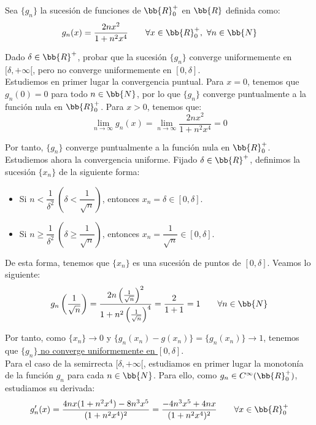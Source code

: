 \begin{ejercicio}
    Sea $\{g_n\}$ la sucesión de funciones de $\bb{R}^+_0$ en $\bb{R}$ definida como:
    \begin{equation*}
        g_n(x) = \frac{2nx^2}{1+n^2x^4} \qquad \forall x\in \bb{R}^+_0,~\forall n\in \bb{N}
    \end{equation*}

    Dado $\delta\in \bb{R}^+$, probar que la sucesión $\{g_n\}$ converge uniformemente en $[\delta,+\infty[$, pero no
    converge uniformemente en $[0,\delta]$.\\


    Estudiemos en primer lugar la convergencia puntual. Para $x=0$, tenemos que $g_n(0)=0$ para todo $n\in \bb{N}$, por lo que $\{g_n\}$ converge puntualmente a la función nula en $\bb{R}^+_0$. Para $x>0$, tenemos que:
    \begin{equation*}
        \lim_{n\to \infty} g_n(x) = \lim_{n\to \infty} \frac{2nx^2}{1+n^2x^4} = 0
    \end{equation*}

    Por tanto, $\{g_n\}$ converge puntualmente a la función nula en $\bb{R}^+_0$.\\

    Estudiemos ahora la convergencia uniforme. Fijado $\delta\in \bb{R}^+$, definimos la sucesión $\{x_n\}$ de la siguiente forma:
    \begin{itemize}
        \item Si $n < \dfrac{1}{\delta^2}~\left(\delta < \dfrac{1}{\sqrt{n}}\right)$, entonces $x_n = \delta \in [0,\delta]$.
        \item Si $n \geq \dfrac{1}{\delta^2}~\left(\delta \geq \dfrac{1}{\sqrt{n}}\right)$, entonces $x_n = \dfrac{1}{\sqrt{n}}\in [0,\delta]$.
    \end{itemize}

    De esta forma, tenemos que $\{x_n\}$ es una sucesión de puntos de $[0,\delta]$. Veamos lo siguiente:
    \begin{equation*}
        g_n\left(\frac{1}{\sqrt{n}}\right) = \frac{2n\left(\frac{1}{\sqrt{n}}\right)^2}{1+n^2\left(\frac{1}{\sqrt{n}}\right)^4} =
        \frac{2}{1+1}=1 \qquad \forall n\in \bb{N}
    \end{equation*}

    Por tanto, como $\{x_n\}\to 0$ y $\{g_n(x_n)-g(x_n)\}=\{g_n(x_n)\}\to 1$, tenemos que \ul{$\{g_n\}$ no converge uniformemente en $[0,\delta]$}.\\

    Para el caso de la semirrecta $[\delta,+\infty[$, estudiamos en primer lugar la monotonía de la función $g_n$ para cada $n\in \bb{N}$. Para ello, como $g_n\in C^\infty(\bb{R}^+_0)$, estudiamos
    su derivada:
    \begin{equation*}
        g_n'(x) = \frac{4nx(1+n^2x^4)-8n^3x^5}{(1+n^2x^4)^2} = \frac{-4n^3x^5+4nx}{(1+n^2x^4)^2} \qquad \forall x\in \bb{R}^+_0
    \end{equation*}


\end{ejercicio}
